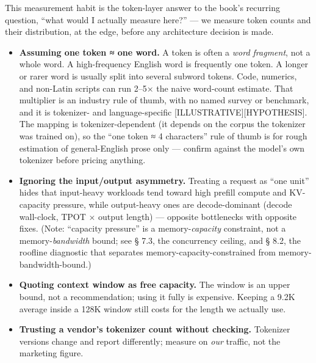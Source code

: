 This measurement habit is the token-layer answer to the book's recurring
question, ``what would I actually measure here?'' --- we measure token
counts and their distribution, at the edge, before any architecture
decision is made.

\label{common-mistakes}


\begin{itemize}
\tightlist
\item
  \textbf{Assuming one token ≈ one word.} A token is often a \emph{word
  fragment}, not a whole word. A high-frequency English word is
  frequently one token. A longer or rarer word is usually split into
  several subword tokens. Code, numerics, and non-Latin scripts can run
  2--5× the naive word-count estimate. That multiplier is an industry
  rule of thumb, with no named survey or benchmark, and it is tokenizer-
  and language-specific \mbox{{[}ILLUSTRATIVE{]}}\hspace{0pt}\mbox{{[}HYPOTHESIS{]}}. The mapping
  is tokenizer-dependent (it depends on the corpus the tokenizer was
  trained on), so the ``one token ≈ 4 characters'' rule of thumb is for
  rough estimation of general-English prose only --- confirm against the
  model's own tokenizer before pricing anything.
\item
  \textbf{Ignoring the input/output asymmetry.} Treating a request as
  ``one unit'' hides that input-heavy workloads tend toward high prefill
  compute and KV-capacity pressure, while output-heavy ones are
  decode-dominant (decode wall-clock, TPOT × output length) --- opposite
  bottlenecks with opposite fixes. (Note: ``capacity pressure'' is a
  memory-\emph{capacity} constraint, not a memory-\emph{bandwidth}
  bound; see § 7.3, the concurrency ceiling, and § 8.2, the roofline
  diagnostic that separates memory-capacity-constrained from
  memory-bandwidth-bound.)
\item
  \textbf{Quoting context window as free capacity.} The window is an
  upper bound, not a recommendation; using it fully is expensive.
  Keeping a 9.2K average inside a 128K window still costs for the length
  we actually use.
\item
  \textbf{Trusting a vendor's tokenizer count without checking.}
  Tokenizer versions change and report differently; measure on
  \emph{our} traffic, not the marketing figure.
\end{itemize}

\label{architecture-consequence}


